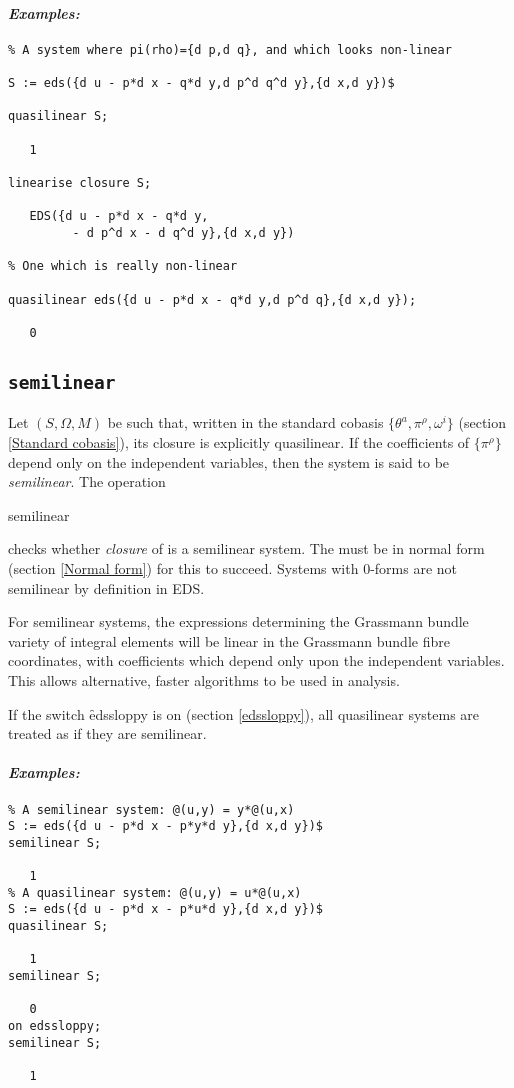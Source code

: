 \paragraph{\it Examples:}
\begin{verbatim}
% A system where pi(rho)={d p,d q}, and which looks non-linear

S := eds({d u - p*d x - q*d y,d p^d q^d y},{d x,d y})$

quasilinear S;

   1

linearise closure S;

   EDS({d u - p*d x - q*d y, 
         - d p^d x - d q^d y},{d x,d y})

% One which is really non-linear

quasilinear eds({d u - p*d x - q*d y,d p^d q},{d x,d y});

   0
\end{verbatim}

\subsection{\tt semilinear}
\label{semilinear}

Let $(S,\Omega,M)$ be such that, written in the standard cobasis
$\{\theta^a,\pi^\rho,\omega^i\}$ (section \ref{Standard cobasis}), its
closure is explicitly quasilinear. If the coefficients of $\{\pi^\rho\}$
depend only on the independent variables, then the system is said to be
{\em semilinear}.  The operation
\begin{syntax}
	semilinear 
\end{syntax}
checks whether {\em closure} of  is a semilinear system. The
 must be in normal form (section \ref{Normal form}) for this to
succeed. Systems with 0-forms are not semilinear by definition in EDS.

For semilinear systems, the expressions determining the Grassmann bundle
variety of integral elements will be linear in the Grassmann bundle fibre
coordinates, with coefficients which depend only upon the independent
variables. This allows alternative, faster algorithms to be used in
analysis.

If the switch \f{edssloppy} is on (section \ref{edssloppy}), all
quasilinear systems are treated as if they are semilinear.

\paragraph{\it Examples:}
\begin{verbatim}
% A semilinear system: @(u,y) = y*@(u,x)
S := eds({d u - p*d x - p*y*d y},{d x,d y})$
semilinear S;

   1
% A quasilinear system: @(u,y) = u*@(u,x)
S := eds({d u - p*d x - p*u*d y},{d x,d y})$
quasilinear S;

   1
semilinear S;

   0
on edssloppy;
semilinear S;

   1
\end{verbatim}

